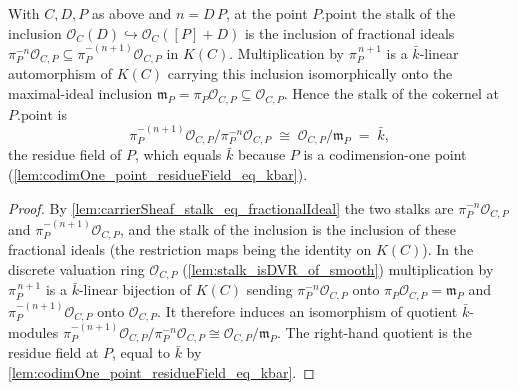 \begin{lemma}
  \label{lem:cokernel_sheafOf_single_add_stalkAtP_iso_kbar}
  With \(C, D, P\) as above and \(n = D\,P\), at the point \(P.\mathrm{point}\)
  the stalk of the inclusion \(\mathcal O_C(D) \hookrightarrow \mathcal
  O_C([P]+D)\) is the inclusion of fractional ideals
  \(\pi_P^{-n}\mathcal O_{C,P} \subseteq \pi_P^{-(n+1)}\mathcal O_{C,P}\) in
  \(K(C)\). Multiplication by \(\pi_P^{\,n+1}\) is a \(\bar k\)-linear
  automorphism of \(K(C)\) carrying this inclusion isomorphically onto the
  maximal-ideal inclusion \(\mathfrak m_P = \pi_P\mathcal O_{C,P} \subseteq
  \mathcal O_{C,P}\). Hence the stalk of the cokernel at \(P.\mathrm{point}\) is
  \[
    \pi_P^{-(n+1)}\mathcal O_{C,P} \big/ \pi_P^{-n}\mathcal O_{C,P}
    \;\cong\; \mathcal O_{C,P}/\mathfrak m_P \;=\; \bar k,
  \]
  the residue field of \(P\), which equals \(\bar k\) because \(P\) is a
  codimension-one point (\cref{lem:codimOne_point_residueField_eq_kbar}).
\end{lemma}

\begin{proof}
  By \cref{lem:carrierSheaf_stalk_eq_fractionalIdeal} the two stalks are
  \(\pi_P^{-n}\mathcal O_{C,P}\) and \(\pi_P^{-(n+1)}\mathcal O_{C,P}\), and the
  stalk of the inclusion is the inclusion of these fractional ideals (the
  restriction maps being the identity on \(K(C)\)). In the discrete valuation
  ring \(\mathcal O_{C,P}\) (\cref{lem:stalk_isDVR_of_smooth}) multiplication by
  \(\pi_P^{\,n+1}\) is a \(\bar k\)-linear bijection of \(K(C)\) sending
  \(\pi_P^{-n}\mathcal O_{C,P}\) onto \(\pi_P\mathcal O_{C,P} = \mathfrak m_P\)
  and \(\pi_P^{-(n+1)}\mathcal O_{C,P}\) onto \(\mathcal O_{C,P}\). It therefore
  induces an isomorphism of quotient \(\bar k\)-modules
  \(\pi_P^{-(n+1)}\mathcal O_{C,P}/\pi_P^{-n}\mathcal O_{C,P} \cong \mathcal
  O_{C,P}/\mathfrak m_P\). The right-hand quotient is the residue field at \(P\),
  equal to \(\bar k\) by \cref{lem:codimOne_point_residueField_eq_kbar}.
\end{proof}

